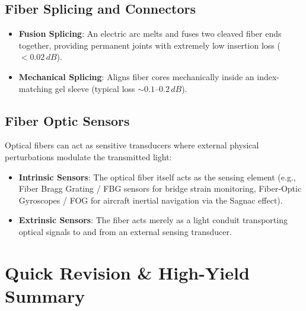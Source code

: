 \subsection{Fiber Splicing and Connectors}
\begin{itemize}
    \item \textbf{Fusion Splicing}: An electric arc melts and fuses two cleaved fiber ends together, providing permanent joints with extremely low insertion loss ($<0.02\,\si{dB}$).
    \item \textbf{Mechanical Splicing}: Aligns fiber cores mechanically inside an index-matching gel sleeve (typical loss $\sim 0.1\text{--}0.2\,\si{dB}$).
\end{itemize}

\subsection{Fiber Optic Sensors}
Optical fibers can act as sensitive transducers where external physical perturbations modulate the transmitted light:
\begin{itemize}
    \item \textbf{Intrinsic Sensors}: The optical fiber itself acts as the sensing element (e.g., Fiber Bragg Grating / FBG sensors for bridge strain monitoring, Fiber-Optic Gyroscopes / FOG for aircraft inertial navigation via the Sagnac effect).
    \item \textbf{Extrinsic Sensors}: The fiber acts merely as a light conduit transporting optical signals to and from an external sensing transducer.
\end{itemize}

\section{Quick Revision \& High-Yield Summary}

